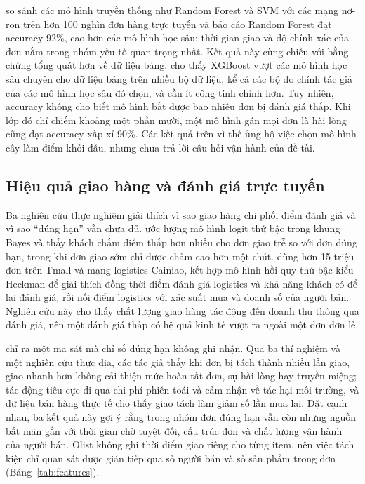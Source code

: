 \textcite{zaghloul2024} so sánh các mô hình truyền thống như Random Forest và SVM với các mạng nơ-ron trên hơn 100 nghìn đơn hàng trực tuyến và báo cáo Random Forest đạt accuracy 92\%, cao hơn các mô hình học sâu; thời gian giao và độ chính xác của đơn nằm trong nhóm yếu tố quan trọng nhất. Kết quả này cùng chiều với bằng chứng tổng quát hơn về dữ liệu bảng. \textcite{shwartzziv2022} cho thấy XGBoost vượt các mô hình học sâu chuyên cho dữ liệu bảng trên nhiều bộ dữ liệu, kể cả các bộ do chính tác giả của các mô hình học sâu đó chọn, và cần ít công tinh chỉnh hơn. Tuy nhiên, accuracy không cho biết mô hình bắt được bao nhiêu đơn bị đánh giá thấp. Khi lớp đó chỉ chiếm khoảng một phần mười, một mô hình gán mọi đơn là hài lòng cũng đạt accuracy xấp xỉ 90\%. Các kết quả trên vì thế ủng hộ việc chọn mô hình cây làm điểm khởi đầu, nhưng chưa trả lời câu hỏi vận hành của đề tài.

\subsection{Hiệu quả giao hàng và đánh giá trực tuyến}\label{sec:rel-delivery}

Ba nghiên cứu thực nghiệm giải thích vì sao giao hàng chi phối điểm đánh giá và vì sao ``đúng hạn'' vẫn chưa đủ. \textcite{ravula2023} ước lượng mô hình logit thứ bậc trong khung Bayes và thấy khách chấm điểm thấp hơn nhiều cho đơn giao trễ so với đơn đúng hạn, trong khi đơn giao sớm chỉ được chấm cao hơn một chút. \textcite{deshpande2023} dùng hơn 15 triệu đơn trên Tmall và mạng logistics Cainiao, kết hợp mô hình hồi quy thứ bậc kiểu Heckman để giải thích đồng thời điểm đánh giá logistics và khả năng khách có để lại đánh giá, rồi nối điểm logistics với xác suất mua và doanh số của người bán. Nghiên cứu này cho thấy chất lượng giao hàng tác động đến doanh thu thông qua đánh giá, nên một đánh giá thấp có hệ quả kinh tế vượt ra ngoài một đơn đơn lẻ.

\textcite{brylla2022} chỉ ra một ma sát mà chỉ số đúng hạn không ghi nhận. Qua ba thí nghiệm và một nghiên cứu thực địa, các tác giả thấy khi đơn bị tách thành nhiều lần giao, giao nhanh hơn không cải thiện mức hoàn tất đơn, sự hài lòng hay truyền miệng; tác động tiêu cực đi qua chi phí phiền toái và cảm nhận về tác hại môi trường, và dữ liệu bán hàng thực tế cho thấy giao tách làm giảm số lần mua lại. Đặt cạnh nhau, ba kết quả này gợi ý rằng trong nhóm đơn đúng hạn vẫn còn những nguồn bất mãn gắn với thời gian chờ tuyệt đối, cấu trúc đơn và chất lượng vận hành của người bán. Olist không ghi thời điểm giao riêng cho từng item, nên việc tách kiện chỉ quan sát được gián tiếp qua số người bán và số sản phẩm trong đơn (Bảng~\ref{tab:features}).

